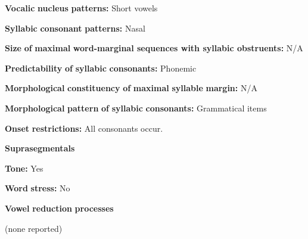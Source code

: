 \begin{styleBody}
\textbf{Vocalic} \textbf{nucleus} \textbf{patterns:} Short vowels
\end{styleBody}

\begin{styleBody}
\textbf{Syllabic} \textbf{consonant} \textbf{patterns:} Nasal
\end{styleBody}

\begin{styleBody}
\textbf{Size} \textbf{of} \textbf{maximal} \textbf{word{}-marginal sequences with syllabic obstruents:} N/A
\end{styleBody}

\begin{styleBody}
\textbf{Predictability} \textbf{of} \textbf{syllabic} \textbf{consonants:} Phonemic
\end{styleBody}

\begin{styleBody}
\textbf{Morphological} \textbf{constituency} \textbf{of} \textbf{maximal} \textbf{syllable} \textbf{margin:} N/A
\end{styleBody}

\begin{styleBody}
\textbf{Morphological} \textbf{pattern} \textbf{of} \textbf{syllabic} \textbf{consonants:} Grammatical items
\end{styleBody}

\begin{styleBody}
\textbf{Onset} \textbf{restrictions:} All consonants occur.
\end{styleBody}

\begin{styleBody}
\textbf{Suprasegmentals}
\end{styleBody}

\begin{styleBody}
\textbf{Tone:} Yes
\end{styleBody}

\begin{styleBody}
\textbf{Word} \textbf{stress:} No
\end{styleBody}

\begin{styleBody}
\textbf{Vowel} \textbf{reduction} \textbf{processes}
\end{styleBody}

\begin{styleBody}
(none reported)
\end{styleBody}


